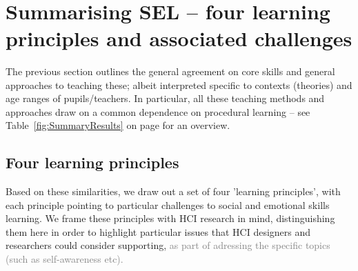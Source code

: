 \documentclass[prodmode,acmtochi]{acmsmall}
\newcommand{\GeraldineTODO}[1]{}
\newcommand{\rephrase}[1]{\textrm{\textrm{\textcolor{gray}{#1}}}}
\begin{document}
\GeraldineTODO{G: (G: add a little more on life coaching since a growing area? example refs in comments - chapter mentions some reviews but says more needed of course  P: I have a psychology of coaching book at home -- I will have a look if anything can be pulled out from there)  P: Plus read the Green2006 paper in more detail}
 









\vfill ~ \pagebreak
\small
\section{Summarising SEL -- four learning principles and associated challenges}
\label{sec:summary} 

The previous section outlines the general agreement on core skills and general approaches to teaching these; albeit interpreted specific to contexts (theories) and age ranges of pupils/teachers. In particular, all these teaching methods and approaches draw on a common dependence on procedural learning -- see Table~\ref{fig:SummaryResults} on page \pageref{fig:SummaryResults} for an overview. 

\subsection{Four learning principles}
Based on these similarities, we draw out a set of four 'learning principles', with each principle pointing to particular challenges to social and emotional skills learning. We frame these principles with HCI research in mind, distinguishing them here in order to highlight particular issues that HCI designers and researchers could consider supporting, \rephrase{as part of adressing the specific topics (such as self-awareness etc).} 
\end{document}
